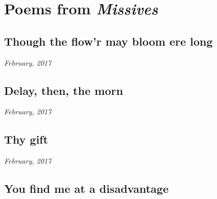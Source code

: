 \documentclass[11pt]{memoir}
\begin{document}
  \frontmatter

  

  \pagestyle{plain}

  \doublespacing

  \maketitle
  \thispagestyle{empty}

  \newpage

  

  \tableofcontents*
  \newpage
  \null
  \cleardoublepage

  \onehalfspacing

    \mainmatter
    \pagestyle{fancyplain}

    \chapter{Poems from \textit{Missives}}
    \thispagestyle{empty}
    \newpage


    \section*{Though the flow'r may bloom ere long}

    \hfill\textit{February, 2017}

    
    \newpage


    \section*{Delay, then, the morn}

    \hfill\textit{February, 2017}

    
    \newpage


    \section*{Thy gift}

    \hfill\textit{February, 2017}

    
    \newpage


    \section*{You find me at a disadvantage}
\end{document}
